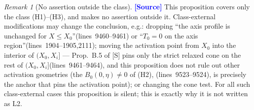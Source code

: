 \documentclass[11pt,a4paper]{article}
\theoremstyle{definition}
\theoremstyle{remark}
\newtheorem{remark}[theorem]{Remark}
\newcommand{\lnos}[1]{(lines~#1)}
\newcommand{\ORIG}{\textcolor{blue}{\textbf{[Source]}}}
\begin{document}
\begin{remark}[No assertion outside the class]
\label{rem:outside}
\ORIG
This proposition covers only the class (H1)--(H3), and makes no assertion outside it. Class-external
modifications may change the conclusion, e.g.:
dropping ``the axis profile is unchanged for $X\le X_0$''\lnos{9460--9461} or ``$T_0=0$ on the axis
region''\lnos{1904--1905,2111};
moving the activation point from $X_0$ into the interior of $(X_0,X_i]$ --- Prop.~B.5 of [S] pins only
the strict relaxed cone on the rest of $(X_0,X_i]$\lnos{9461--9464}, and this proposition does not rule
out other activation geometries (the $B_0(0,\eta)\ne0$ of (H2), \lnos{9523--9524}, is precisely the anchor
that pins the activation point);
or changing the cone test. For all such class-external cases this proposition is silent; this is exactly
why it is not written as L2.
\end{remark}
\end{document}
